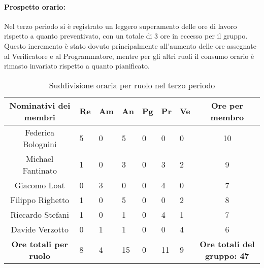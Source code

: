 \paragraph{Prospetto orario: }
Nel terzo periodo si è registrato un leggero superamento delle ore di lavoro rispetto a quanto preventivato, con un totale di 3 ore in eccesso per il gruppo.\\
Questo incremento è stato dovuto principalmente all’aumento delle ore assegnate al Verificatore e al Programmatore, mentre per gli altri ruoli il consumo orario è rimasto invariato rispetto a quanto pianificato.
\begin{table}[h!]
    \centering
    \renewcommand{\arraystretch}{1.5}
    \begin{tabularx}{\textwidth}{|c|X|X|X|X|X|X|c|}\hline
    \rowcolor[HTML]{FFD700} 
    \textbf{Nominativi dei membri} & \textbf{Re} & \textbf{Am} & \textbf{An} & \textbf{Pg} & \textbf{Pr} & \textbf{Ve} & \textbf{Ore per membro} \\ \hline
    Federica Bolognini & 5 & 0 & 5 & 0 & 0 & 0 & 10  \\ \hline
    Michael Fantinato  & 1 & 0 & 3 & 0 & 3 & 2 & 9  \\ \hline
    Giacomo Loat       & 0 & 3 & 0 & 0 & 4 & 0 & 7 \\ \hline
    Filippo Righetto   & 1 & 0 & 5 & 0 & 0 & 2 & 8  \\ \hline
    Riccardo Stefani   & 1 & 0 & 1 & 0 & 4 & 1 & 7 \\ \hline
    Davide Verzotto    & 0 & 1 & 1 & 0 & 0 & 4 & 6  \\ \hline
    \rowcolor[HTML]{FFD700} 
    \textbf{Ore totali per ruolo} & 8 & 4 & 15 & 0 & 11 & 9 & \textbf{Ore totali del gruppo: 47} \\ \hline
    \end{tabularx}
    \caption{Suddivisione oraria per ruolo nel terzo periodo}
\end{table}

